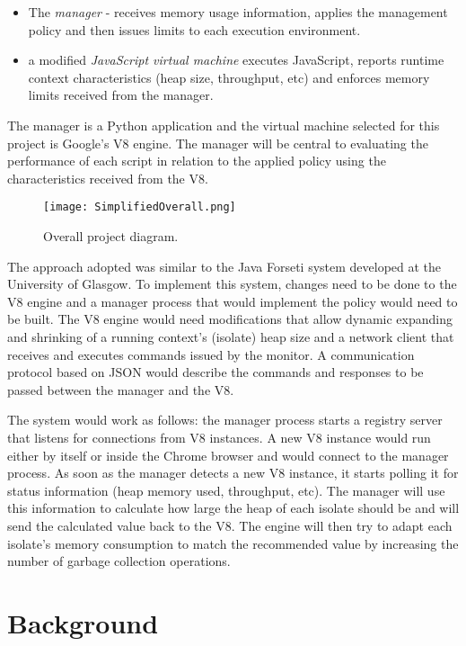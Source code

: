 \documentclass{l4proj}
\begin{document}
\begin{itemize}
\item The \textit{manager} - receives memory usage information, applies the management policy and then issues limits to each execution environment.
\item a modified \textit{JavaScript virtual machine} executes JavaScript, reports runtime context characteristics (heap size, throughput, etc) and enforces memory limits received from the manager.
\end{itemize}
The manager is a Python application and the virtual machine selected for this project is Google's V8 engine. The manager will be central to evaluating the performance of each script in relation to the applied policy using the characteristics received from the V8. 
\begin{figure}[!ht]
  \caption{Overall project diagram.}
  \centering
    \texttt{[image: SimplifiedOverall.png]}
\end{figure}

The approach adopted was similar to the Java Forseti system developed at the University of Glasgow\cite{forseti}. To implement this system, changes need to be done to the V8 engine and a manager process that would implement the policy would need to be built. The V8 engine would need modifications that allow dynamic expanding and shrinking of a running context's (isolate) heap size and a network client that receives and executes commands issued by the monitor. A communication protocol based on JSON would describe the commands and responses to be passed between the manager and the V8. %

The system would work as follows: the manager process starts a registry server that listens for connections from V8 instances. A new V8 instance would run either by itself or inside the Chrome browser and would connect to the manager process. As soon as the manager detects a new V8 instance, it starts polling it for status information (heap memory used, throughput, etc). The manager will use this information to calculate how large the heap of each isolate should be and will send the calculated value back to the V8. The engine will then try to adapt each isolate's memory consumption to match the recommended value by increasing the number of garbage collection operations.
\section{Background}
\end{document}

